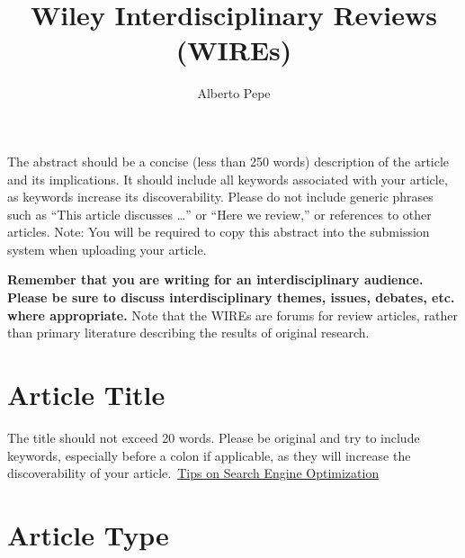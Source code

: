 \documentclass[10pt]{article}
\renewenvironment{abstract}
  {{\bfseries\noindent{\abstractname}\par\nobreak}\footnotesize}
  {\bigskip}
\begin{document}
\title{Wiley Interdisciplinary Reviews (WIREs)}



\author[1]{Alberto Pepe}%
%


\vspace{-1em}



  \date{}


\begingroup
\let\center\flushleft
\let\endcenter\endflushleft
\maketitle
\endgroup





\begin{abstract}
The abstract should be a concise (less than 250 words) description of
the article and its implications. It should include all keywords
associated with your article, as keywords increase its discoverability.
Please do not include generic phrases such as ``This article discusses
\ldots{}'' or ``Here we review,'' or references to other articles. Note:
You will be required to copy this abstract into the submission system
when uploading your article.%
\end{abstract}%



\sloppy


\textbf{Remember that you are writing for an interdisciplinary audience.
Please be sure to discuss interdisciplinary themes, issues, debates,
etc. where appropriate.} Note that the WIREs are forums for review
articles, rather than primary literature describing the results of
original research.

\section*{Article Title}

{\label{350486}}

The title should not exceed 20 words. Please be original and try to
include keywords, especially before a colon if applicable, as they will
increase the discoverability of your
article.~\href{https://authorservices.wiley.com/author-resources/Journal-Authors/Prepare/writing-for-seo.html}{Tips
on Search Engine Optimization}

\section*{Article Type}
\end{document}
